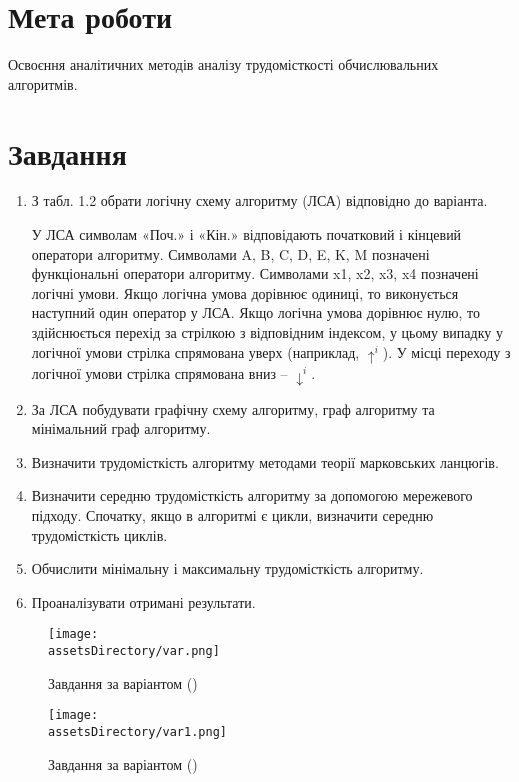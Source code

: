 \section{Мета роботи}
Освоєння аналітичних методів аналізу трудомісткості обчислювальних алгоритмів.


\section{Завдання}
\begin{enumerate}
    \item З табл. 1.2 обрати логічну схему алгоритму (ЛСА) відповідно до
    варіанта.

У ЛСА символам «Поч.» і «Кін.» відповідають початковий і кінцевий
оператори алгоритму. Символами A, B, C, D, E, K, M позначені
функціональні оператори алгоритму. Символами x1, x2, x3, x4 позначені
логічні умови. Якщо логічна умова дорівнює одиниці, то виконується
наступний один оператор у ЛСА. Якщо логічна умова дорівнює нулю, то
здійснюється перехід за стрілкою з відповідним індексом, у цьому випадку
у логічної умови стрілка спрямована уверх (наприклад, $\uparrow^i$). У місці переходу
з логічної умови стрілка спрямована вниз – $\downarrow^i$.
    \item За ЛСА побудувати графічну схему алгоритму, граф алгоритму та мінімальний граф алгоритму.
    \item Визначити трудомісткість алгоритму методами теорії марковських ланцюгів.
    \item Визначити середню трудомісткість алгоритму за допомогою
    мережевого підходу. Спочатку, якщо в алгоритмі є цикли, визначити
    середню трудомісткість циклів.
    \item Обчислити мінімальну і максимальну трудомісткість алгоритму.
    \item Проаналізувати отримані результати.
\end{enumerate}

\begin{figure}[ht!]
    \centering
    \texttt{[image: \\assetsDirectory/var.png]}
    \caption{Завдання за варіантом (\variant)}
\end{figure}

\begin{figure}[ht!]
    \centering
    \texttt{[image: \\assetsDirectory/var1.png]}
    \caption{Завдання за варіантом (\variant)}
\end{figure}

\newpage
